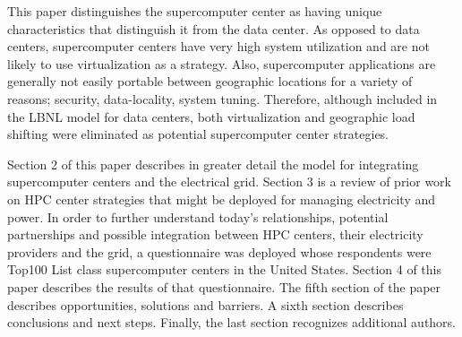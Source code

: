 This paper distinguishes the supercomputer center as having unique characteristics that distinguish it from the data center. As opposed to data centers, supercomputer centers have very high system utilization and are not likely to use virtualization as a strategy.  
Also, supercomputer applications are generally not easily portable between geographic locations for a variety of reasons; security, data-locality, system tuning. 
Therefore, although included in the LBNL model for data centers, both virtualization and geographic load shifting were eliminated as potential supercomputer center strategies.

Section 2 of this paper describes in greater detail the model for
integrating supercomputer centers and the electrical grid. Section 3 
is a review of prior work on HPC center strategies that might be
deployed for managing electricity and power. In order to further understand
today's relationships, potential partnerships and possible integration
between HPC centers, their electricity providers and the grid, a
questionnaire was deployed whose respondents were Top100 List class
supercomputer centers in the United States. Section 4 of this paper
describes the results of that questionnaire. The fifth section of the paper
describes opportunities, solutions and barriers. A sixth section describes
conclusions and next steps. Finally, the last section recognizes additional
authors.

